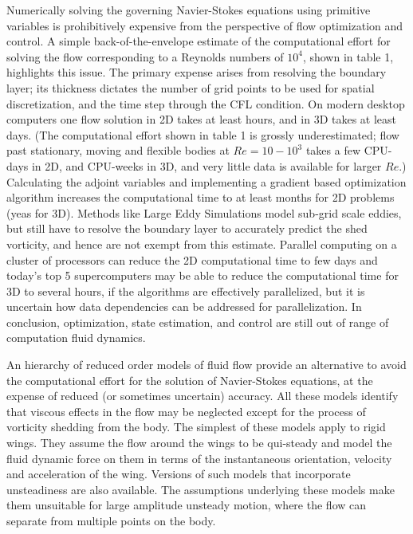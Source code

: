Numerically solving the governing Navier-Stokes equations using primitive variables is prohibitively expensive from the perspective of flow optimization and control.
A simple back-of-the-envelope estimate of the computational effort for solving the flow corresponding to a Reynolds numbers of $10^4$, shown in table 1, highlights this issue.
The primary expense arises from resolving the boundary layer; its thickness dictates the number of grid points to be used for spatial discretization, and the time step through the CFL condition.
On modern desktop computers one flow solution in 2D takes at least hours, and in 3D takes at least days. (The computational effort shown in table 1 is grossly underestimated; flow past stationary, moving and flexible bodies at $Re = 10 - 10^3$ takes a few CPU-days in 2D, and CPU-weeks in 3D, and very little data is available for larger $Re$.)
Calculating the adjoint variables and implementing a gradient based optimization algorithm increases the computational time to at least months for 2D problems (yeas for 3D).
Methods like Large Eddy Simulations model sub-grid scale eddies, but still have to resolve the boundary layer to accurately predict the shed vorticity, and hence are not exempt from this estimate.
Parallel computing on a cluster of processors can reduce the 2D computational time to few days and today's top 5 supercomputers may be able to reduce the computational time for 3D to several hours, if the algorithms are effectively parallelized, but it is uncertain how data dependencies can be addressed for parallelization.
In conclusion, optimization, state estimation, and control are still out of range of computation fluid dynamics.

An hierarchy of reduced order models of fluid flow provide an alternative to avoid the computational effort for the solution of Navier-Stokes equations, at the expense of reduced (or sometimes uncertain) accuracy.
All these models identify that viscous effects in the flow may be neglected except for the process of vorticity shedding from the body.
The simplest of these models apply to rigid wings.
They assume the flow around the wings to be qui-steady and model the fluid dynamic force on them in terms of the instantaneous orientation, velocity and acceleration of the wing.
Versions of such models that incorporate unsteadiness are also available.
The assumptions underlying these models make them unsuitable for large amplitude unsteady motion, where the flow can separate from multiple points on the body.

